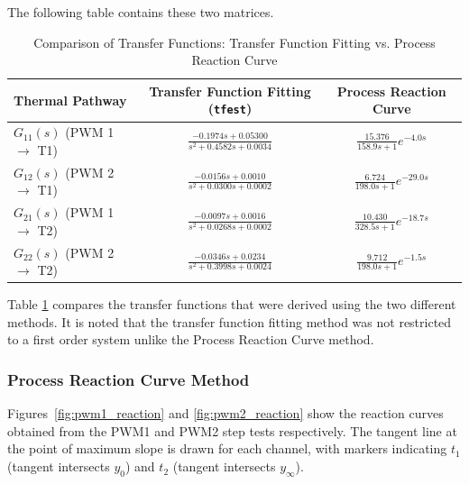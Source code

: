 The following table contains these two matrices.

\begin{table}[htbp]
    \centering
    \renewcommand{\arraystretch}{2.5} 
    \caption{Comparison of Transfer Functions: Transfer Function Fitting vs. Process Reaction Curve}
    \label{tab:transfer_function_comparison}
    \begin{tabular}{lcc}
        \hline
        \textbf{Thermal Pathway} & \textbf{Transfer Function Fitting (\texttt{tfest})} & \textbf{Process Reaction Curve} \\
        \hline
        
        $G_{11}(s)$ (PWM 1 $\rightarrow$ T1) & 
        $\frac{-0.1974s + 0.05300}{s^2 + 0.4582s + 0.0034}$ & 
        $\frac{15.376}{158.9s + 1} e^{-4.0s}$ \\
        
        $G_{12}(s)$ (PWM 2 $\rightarrow$ T1) & 
        $\frac{-0.0156 s + 0.0010}{s^2 + 0.0300 s + 0.0002}$ & 
        $\frac{6.724}{198.0s + 1} e^{-29.0s}$ \\
        
        $G_{21}(s)$ (PWM 1 $\rightarrow$ T2) & 
        $\frac{-0.0097 s + 0.0016}{s^2 + 0.0268 s + 0.0002}$ & 
        $\frac{10.430}{328.5s + 1} e^{-18.7s}$ \\
        
        $G_{22}(s)$ (PWM 2 $\rightarrow$ T2) & 
        $\frac{-0.0346 s + 0.0234}{s^2 + 0.3998 s + 0.0024}$ & 
        $\frac{9.712}{198.0s + 1} e^{-1.5s}$ \\
        
        \hline
    \end{tabular}
\end{table}


Table \ref{tab:transfer_function_comparison} compares the transfer functions that were derived using the two different methods.
It is noted that the transfer function fitting method was not restricted to a first order system unlike the Process Reaction Curve method.

\subsubsection{Process Reaction Curve Method}
Figures~\ref{fig:pwm1_reaction} and \ref{fig:pwm2_reaction} show the reaction
curves obtained from the PWM1 and PWM2 step tests respectively. The tangent line
at the point of maximum slope is drawn for each channel, with markers indicating
$t_1$ (tangent intersects $y_0$) and $t_2$ (tangent intersects $y_\infty$).

